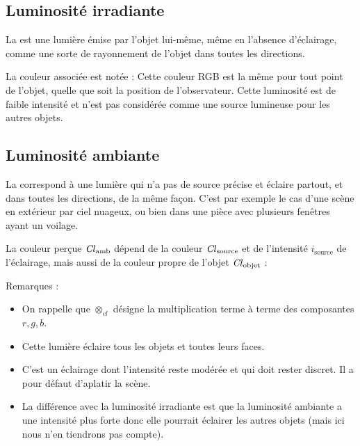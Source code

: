 \documentclass[11pt,class=report,crop=false]{standalone}
\begin{document}
\subsection{Luminosité irradiante}

La  est une lumière émise par l'objet lui-même, même en l'absence d'éclairage, comme une sorte de rayonnement de l'objet dans toutes les directions. 


La couleur associée est notée : 
Cette couleur RGB est la même pour tout point de l'objet, quelle que soit la position de l'observateur. 
Cette luminosité est de faible intensité et n'est pas considérée comme une source lumineuse pour les autres objets.



\subsection{Luminosité ambiante}


La  correspond à une lumière qui n'a pas de source précise et éclaire partout, et dans toutes les directions, de la même façon. C'est par exemple le cas d'une scène en extérieur par ciel nuageux, ou bien dans une pièce avec plusieurs fenêtres ayant un voilage. 


La couleur perçue $\operatorname{\it Cl}_{\text{amb}}$ dépend de la couleur $\operatorname{\it Cl}_{\text{source}}$ et de l'intensité $i_{\text{source}}$ de l'éclairage, mais aussi de la couleur propre de l'objet $\operatorname{\it Cl}_{\text{objet}}$ :

Remarques :
\begin{itemize}
  \item On rappelle que $\otimes_{cl}$ désigne la multiplication terme à terme des composantes $r,g,b$.
  
  \item Cette lumière éclaire tous les objets et toutes leurs faces.

  \item C'est un éclairage dont l'intensité reste modérée et qui doit rester discret. Il a pour défaut \og{}d'aplatir\fg{} la scène.

  \item La différence avec la luminosité irradiante est que la luminosité ambiante a une intensité plus forte donc elle pourrait éclairer les autres objets (mais ici nous n'en tiendrons pas compte).
\end{itemize}
\end{document}
